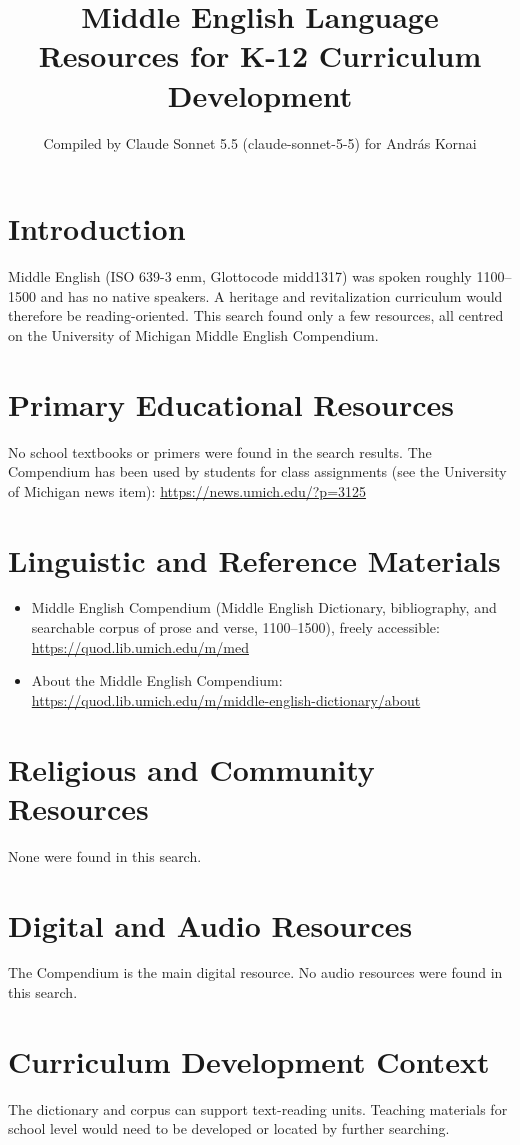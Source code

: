 \documentclass[12pt]{article}
\title{Middle English Language Resources for K-12 Curriculum Development}
\author{Compiled by Claude Sonnet 5.5 (claude-sonnet-5-5) for Andr\'as Kornai}
\date{}
\begin{document}
\maketitle
\section{Introduction}
Middle English (ISO 639-3 enm, Glottocode midd1317) was spoken roughly 1100--1500 and has no native speakers. A heritage and revitalization curriculum would therefore be reading-oriented. This search found only a few resources, all centred on the University of Michigan Middle English Compendium.
\section{Primary Educational Resources}
No school textbooks or primers were found in the search results. The Compendium has been used by students for class assignments (see the University of Michigan news item):
\url{https://news.umich.edu/?p=3125}
\section{Linguistic and Reference Materials}
\begin{itemize}
\item Middle English Compendium (Middle English Dictionary, bibliography, and searchable corpus of prose and verse, 1100--1500), freely accessible: \url{https://quod.lib.umich.edu/m/med}
\item About the Middle English Compendium: \url{https://quod.lib.umich.edu/m/middle-english-dictionary/about}
\end{itemize}
\section{Religious and Community Resources}
None were found in this search.
\section{Digital and Audio Resources}
The Compendium is the main digital resource. No audio resources were found in this search.
\section{Curriculum Development Context}
The dictionary and corpus can support text-reading units. Teaching materials for school level would need to be developed or located by further searching.
\end{document}
